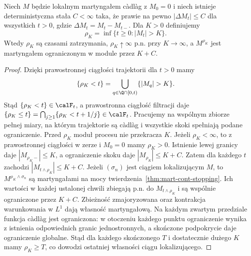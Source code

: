 \begin{twierdzenie}
\label{thm:bounded-jumps-localization}
Niech $M$ będzie lokalnym martyngałem c\`adl\`ag
z $M_0=0$ i niech istnieje deterministyczna
stała $C<\infty$ taka, że prawie na pewno
$|\Delta M_t|\le C$ dla wszystkich $t>0$,
gdzie $\Delta M_t=M_t-M_{t-}$.
Dla $K>0$ definiujemy
\[
\rho_K=\inf\{t\ge0:|M_t|>K\}.
\]
Wtedy $\rho_K$ są czasami zatrzymania,
$\rho_K\uparrow\infty$ p.n. przy $K\to\infty$,
a $M^{\rho_K}$ jest martyngałem ograniczonym
w module przez $K+C$.
\end{twierdzenie}
\begin{proof}
Dzięki prawostronnej ciągłości trajektorii
dla $t>0$ mamy
\[
\{\rho_K<t\}
=\bigcup_{q\in\Q\cap[0,t)}\{|M_q|>K\}.
\]
Stąd $\{\rho_K<t\}\in\calF_t$, a prawostronna
ciągłość filtracji daje
$\{\rho_K\le t\}=\bigcap_{j\ge1}
\{\rho_K<t+1/j\}\in\calF_t$.
Pracujemy na wspólnym zbiorze pełnej miary,
na którym trajektorie są c\`adl\`ag i wszystkie
skoki spełniają podane ograniczenie.
Przed $\rho_K$ moduł procesu nie przekracza $K$.
Jeżeli $\rho_K<\infty$, to z prawostronnej
ciągłości w zerze i $M_0=0$ mamy $\rho_K>0$.
Istnienie lewej granicy daje $|M_{\rho_K-}|\le K$,
a ograniczenie skoku daje
$|M_{\rho_K}|\le K+C$.
Zatem dla każdego $t$ zachodzi
$|M_{t\wedge\rho_K}|\le K+C$.
Jeżeli $(\sigma_n)$ jest ciągiem lokalizującym
$M$, to $M^{\rho_K\wedge\sigma_n}$ są martyngałami
na mocy twierdzenia~\ref{thm:mart-cont-stopping}.
Ich wartości w każdej ustalonej chwili
zbiegają p.n. do $M_{t\wedge\rho_K}$ i są
wspólnie ograniczone przez $K+C$.
Zbieżność zmajoryzowana oraz kontrakcja
warunkowania w $L^1$ dają własność martyngałową.
Na każdym zwartym przedziale funkcja c\`adl\`ag
jest ograniczona: w otoczeniu każdego punktu
ograniczenie wynika z istnienia odpowiednich
granic jednostronnych, a skończone podpokrycie
daje ograniczenie globalne. Stąd dla każdego
skończonego $T$ i dostatecznie dużego $K$
mamy $\rho_K\ge T$, co dowodzi ostatniej
własności ciągu lokalizującego.
\end{proof}

